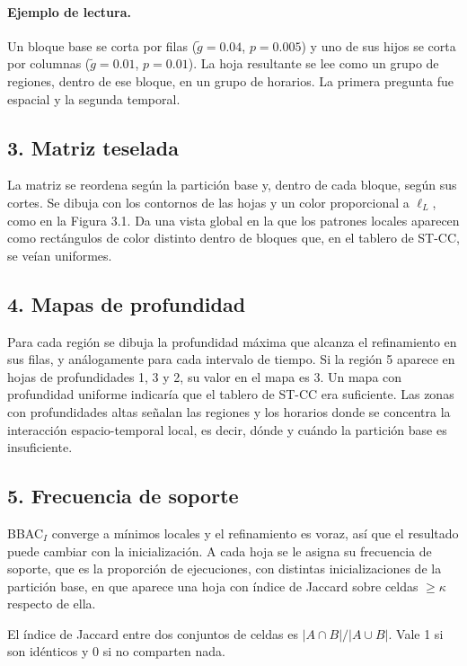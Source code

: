 \documentclass[11pt,a4paper]{article}
\begin{document}
\paragraph{Ejemplo de lectura.} Un bloque base se corta por filas ($\tilde g=0.04$,
$p=0.005$) y uno de sus hijos se corta por columnas ($\tilde g=0.01$, $p=0.01$). La
hoja resultante se lee como un grupo de regiones, dentro de ese bloque, en un grupo
de horarios. La primera pregunta fue espacial y la segunda temporal.

\subsection{3. Matriz teselada}

La matriz se reordena según la partición base y, dentro de cada bloque, según sus
cortes. Se dibuja con los contornos de las hojas y un color proporcional a $\ell_L$,
como en la Figura 3.1. Da una vista global en la que los patrones locales aparecen
como rectángulos de color distinto dentro de bloques que, en el tablero de ST-CC, se
veían uniformes.

\subsection{4. Mapas de profundidad}

Para cada región se dibuja la profundidad máxima que alcanza el refinamiento en sus
filas, y análogamente para cada intervalo de tiempo. Si la región 5 aparece en hojas
de profundidades 1, 3 y 2, su valor en el mapa es 3. Un mapa con profundidad uniforme
indicaría que el tablero de ST-CC era suficiente. Las zonas con profundidades altas
señalan las regiones y los horarios donde se concentra la interacción
espacio-temporal local, es decir, dónde y cuándo la partición base es insuficiente.

\subsection{5. Frecuencia de soporte}

BBAC$_I$ converge a mínimos locales y el refinamiento es voraz, así que el resultado
puede cambiar con la inicialización. A cada hoja se le asigna su frecuencia de
soporte, que es la proporción de ejecuciones, con distintas inicializaciones de la
partición base, en que aparece una hoja con índice de Jaccard sobre celdas
$\ge\kappa$ respecto de ella.

El índice de Jaccard entre dos conjuntos de celdas es $|A\cap B|/|A\cup B|$. Vale 1
si son idénticos y 0 si no comparten nada.
\end{document}
